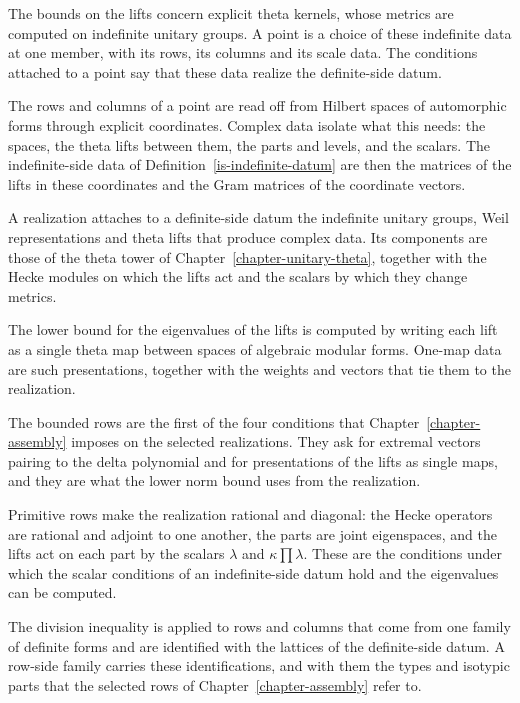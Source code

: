 The bounds on the lifts concern explicit theta kernels, whose metrics are computed on indefinite
unitary groups. A point is a choice of these indefinite data at one member, with its rows, its
columns and its scale data. The conditions attached to a point say that these data realize the
definite-side datum.

The rows and columns of a point are read off from Hilbert spaces of automorphic forms through
explicit coordinates. Complex data isolate what this needs: the spaces, the theta lifts between them,
the parts and levels, and the scalars. The indefinite-side data of
Definition~\ref{is-indefinite-datum} are then the matrices of the lifts in these coordinates and the
Gram matrices of the coordinate vectors.

A realization attaches to a definite-side datum the indefinite unitary groups, Weil representations
and theta lifts that produce complex data. Its components are those of the theta tower of
Chapter~\ref{chapter-unitary-theta}, together with the Hecke modules on which the lifts act and the
scalars by which they change metrics.

The lower bound for the eigenvalues of the lifts is computed by writing each lift as a single theta
map between spaces of algebraic modular forms. One-map data are such presentations, together with
the weights and vectors that tie them to the realization.

The bounded rows are the first of the four conditions that Chapter~\ref{chapter-assembly} imposes
on the selected realizations. They ask for extremal vectors pairing to the delta polynomial and for
presentations of the lifts as single maps, and they are what the lower norm bound uses from the
realization.

Primitive rows make the realization rational and diagonal: the Hecke operators are rational and
adjoint to one another, the parts are joint eigenspaces, and the lifts act on each part by the
scalars $\lambda$ and $\kappa\prod\lambda$. These are the conditions under which the scalar conditions of
an indefinite-side datum hold and the eigenvalues can be computed.

The division inequality is applied to rows and columns that come from one family of definite forms
and are identified with the lattices of the definite-side datum. A row-side family carries these
identifications, and with them the types and isotypic parts that the selected rows of
Chapter~\ref{chapter-assembly} refer to.

